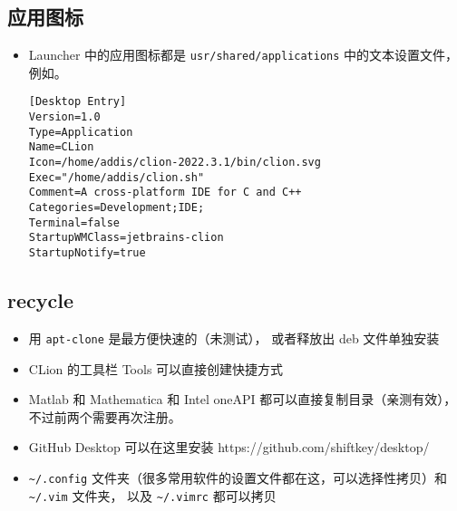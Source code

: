 \subsection{应用图标}
\begin{itemize}
\item Launcher 中的应用图标都是 \verb|usr/shared/applications| 中的文本设置文件， 例如。
\begin{lstlisting}[language=none]
[Desktop Entry]
Version=1.0
Type=Application
Name=CLion
Icon=/home/addis/clion-2022.3.1/bin/clion.svg
Exec="/home/addis/clion.sh"
Comment=A cross-platform IDE for C and C++
Categories=Development;IDE;
Terminal=false
StartupWMClass=jetbrains-clion
StartupNotify=true
\end{lstlisting}
\end{itemize}


\subsection{recycle}
\begin{itemize}
\item 用 \verb`apt-clone` 是最方便快速的（未测试）， 或者释放出 deb 文件单独安装
\item CLion 的工具栏 Tools 可以直接创建快捷方式
\item Matlab 和 Mathematica 和 Intel oneAPI 都可以直接复制目录（亲测有效）， 不过前两个需要再次注册。
\item GitHub Desktop 可以在这里安装 https://github.com/shiftkey/desktop/
\item \verb`~/.config` 文件夹（很多常用软件的设置文件都在这，可以选择性拷贝）和 \verb`~/.vim` 文件夹， 以及 \verb`~/.vimrc` 都可以拷贝
\end{itemize}
